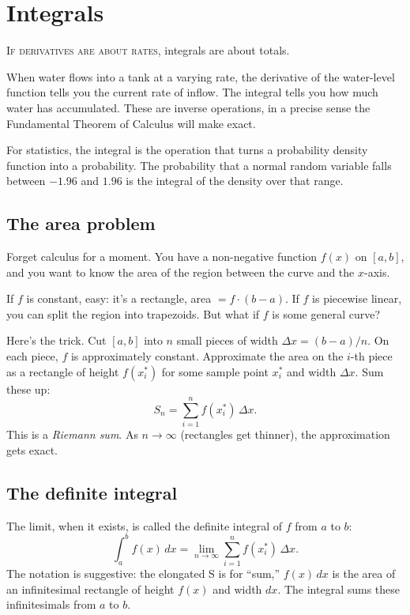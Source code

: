\chapter{Integrals}
\label{ch:integrals}

\noindent\textsc{If derivatives are about rates,} integrals are about totals.

When water flows into a tank at a varying rate, the derivative of the water-level function tells you the current rate of inflow. The integral tells you how much water has accumulated. These are inverse operations, in a precise sense the Fundamental Theorem of Calculus will make exact.

For statistics, the integral is the operation that turns a probability density function into a probability. The probability that a normal random variable falls between $-1.96$ and $1.96$ is the integral of the density over that range.

\section{The area problem}

Forget calculus for a moment. You have a non-negative function $f(x)$ on $[a, b]$, and you want to know the area of the region between the curve and the $x$-axis.

If $f$ is constant, easy: it's a rectangle, area $= f \cdot (b - a)$. If $f$ is piecewise linear, you can split the region into trapezoids. But what if $f$ is some general curve?

Here's the trick. Cut $[a, b]$ into $n$ small pieces of width $\Delta x = (b-a)/n$. On each piece, $f$ is approximately constant. Approximate the area on the $i$-th piece as a rectangle of height $f(x_i^*)$ for some sample point $x_i^*$ and width $\Delta x$. Sum these up:
\begin{equation}
  S_n = \sum_{i=1}^{n} f(x_i^*) \, \Delta x.
  \label{eq:riemann-sum}
\end{equation}
This is a \emph{Riemann sum}. As $n \to \infty$ (rectangles get thinner), the approximation gets exact.

\section{The definite integral}

The limit, when it exists, is called the definite integral of $f$ from $a$ to $b$:
\begin{equation}
  \boxed{\int_a^b f(x) \, dx = \lim_{n \to \infty} \sum_{i=1}^{n} f(x_i^*) \, \Delta x.}
  \label{eq:definite-integral}
\end{equation}
The notation is suggestive: the elongated S is for ``sum,'' $f(x)\,dx$ is the area of an infinitesimal rectangle of height $f(x)$ and width $dx$. The integral sums these infinitesimals from $a$ to $b$.

